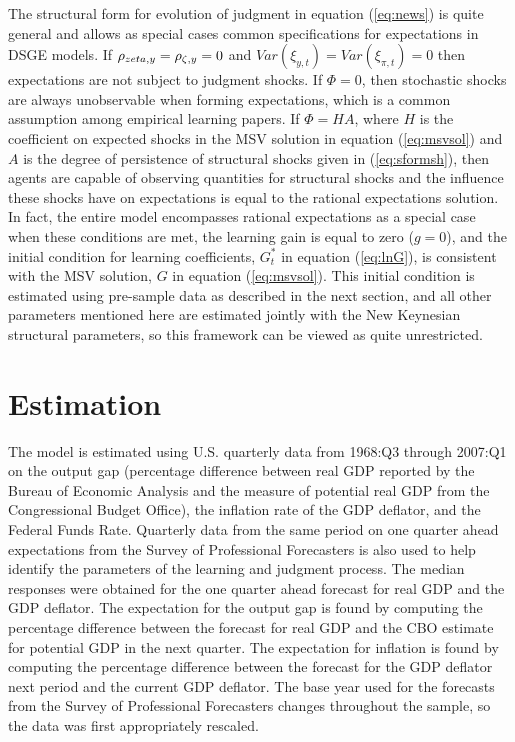 \documentclass[10pt]{article}
\begin{document}
The structural form for evolution of judgment in equation (\ref{eq:news}) is quite general and allows as special cases common specifications for expectations in DSGE models.  If $\rho_{\\zeta,y} = \rho_{\zeta,y} = 0$ and $Var(\xi_{y,t}) = Var(\xi_{\pi,t}) = 0$ then expectations are not subject to judgment shocks.  If $\Phi=0$, then stochastic shocks are always unobservable when forming expectations, which is a common assumption among empirical learning papers.  If $\Phi=HA$, where $H$ is the coefficient on expected shocks in the MSV solution in equation (\ref{eq:msvsol}) and $A$ is the degree of persistence of structural shocks given in (\ref{eq:sformsh}), then agents are capable of observing quantities for structural shocks and the influence these shocks have on expectations is equal to the rational expectations solution.  In fact, the entire model encompasses rational expectations as a special case when these conditions are met, the learning gain is equal to zero ($g=0$), and the initial condition for learning coefficients, $G_t^*$ in equation (\ref{eq:lnG}), is consistent with the MSV solution, $G$ in equation (\ref{eq:msvsol}).  This initial condition is estimated using pre-sample data as described in the next section, and all other parameters mentioned here are estimated jointly with the New Keynesian structural parameters, so this framework can be viewed as quite unrestricted.

\section{Estimation}

The model is estimated using U.S. quarterly data from 1968:Q3 through 2007:Q1 on the output gap (percentage difference between real GDP reported by the Bureau of Economic Analysis and the measure of potential real GDP from the Congressional Budget Office), the inflation rate of the GDP deflator, and the Federal Funds Rate.  Quarterly data from the same period on one quarter ahead expectations from the Survey of Professional Forecasters is also used to help identify the parameters of the learning and judgment process.  The median responses were obtained for the one quarter ahead forecast for real GDP and the GDP deflator.  The expectation for the output gap is found by computing the percentage difference between the forecast for real GDP and the CBO estimate for potential GDP in the next quarter.  The expectation for inflation is found by computing the percentage difference between the forecast for the GDP deflator next period and the current GDP deflator.  The base year used for the forecasts from the Survey of Professional Forecasters changes throughout the sample, so the data was first appropriately rescaled.
\end{document}
